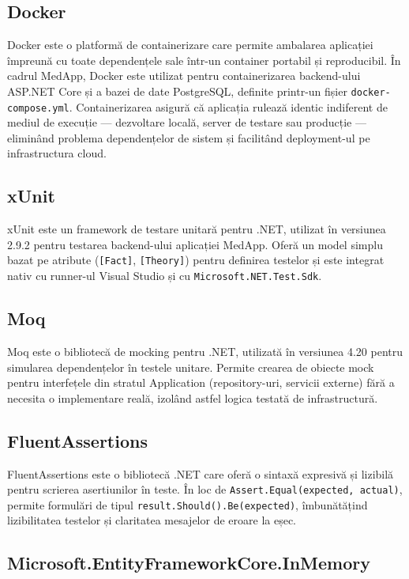 \documentclass[12pt, a4paper]{report}
\begin{document}
\subsection{Docker}

Docker este o platformă de containerizare care permite ambalarea aplicației
împreună cu toate dependențele sale într-un container portabil și reproducibil.
În cadrul MedApp, Docker este utilizat pentru containerizarea backend-ului
ASP.NET Core și a bazei de date PostgreSQL, definite printr-un fișier
\texttt{docker-compose.yml}. Containerizarea asigură că aplicația rulează
identic indiferent de mediul de execuție --- dezvoltare locală, server de
testare sau producție --- eliminând problema dependențelor de sistem și
facilitând deployment-ul pe infrastructura cloud.

\subsection{xUnit}

xUnit este un framework de testare unitară pentru .NET, utilizat în versiunea
2.9.2 pentru testarea backend-ului aplicației MedApp. Oferă un model simplu
bazat pe atribute (\texttt{[Fact]}, \texttt{[Theory]}) pentru definirea
testelor și este integrat nativ cu runner-ul Visual Studio și cu
\texttt{Microsoft.NET.Test.Sdk}.

\subsection{Moq}

Moq este o bibliotecă de mocking pentru .NET, utilizată în versiunea 4.20
pentru simularea dependențelor în testele unitare. Permite crearea de obiecte
mock pentru interfețele din stratul Application (repository-uri, servicii
externe) fără a necesita o implementare reală, izolând astfel logica testată
de infrastructură.

\subsection{FluentAssertions}

FluentAssertions este o bibliotecă .NET care oferă o sintaxă expresivă și
lizibilă pentru scrierea asertiunilor în teste. În loc de \texttt{Assert.Equal(expected, actual)}, permite formulări de tipul
\texttt{result.Should().Be(expected)}, îmbunătățind lizibilitatea testelor
și claritatea mesajelor de eroare la eșec.

\subsection{Microsoft.EntityFrameworkCore.InMemory}
\end{document}
